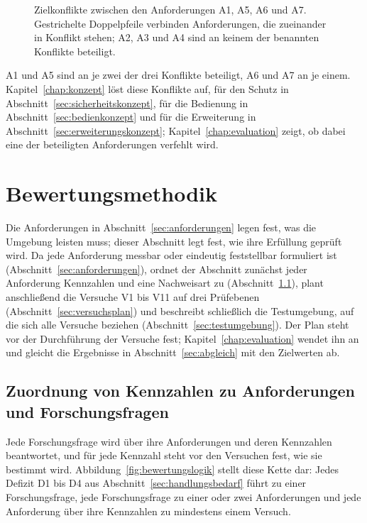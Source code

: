\begin{figure}[htbp]
  \centering
  
  \caption[Zielkonflikte zwischen den Anforderungen]{Zielkonflikte zwischen den Anforderungen A1, A5, A6 und A7. Gestrichelte Doppelpfeile verbinden Anforderungen, die zueinander in Konflikt stehen; A2, A3 und A4 sind an keinem der benannten Konflikte beteiligt.}
  \label{fig:zielkonflikte}
\end{figure}

A1 und A5 sind an je zwei der drei Konflikte beteiligt, A6 und A7 an je einem.
Kapitel~\ref{chap:konzept} löst diese Konflikte auf, für den Schutz in Abschnitt~\ref{sec:sicherheitskonzept}, für die Bedienung in Abschnitt~\ref{sec:bedienkonzept} und für die Erweiterung in Abschnitt~\ref{sec:erweiterungskonzept}; Kapitel~\ref{chap:evaluation} zeigt, ob dabei eine der beteiligten Anforderungen verfehlt wird.

\section{Bewertungsmethodik}
\label{sec:bewertungsmethodik}
Die Anforderungen in Abschnitt~\ref{sec:anforderungen} legen fest, was die Umgebung leisten muss; dieser Abschnitt legt fest, wie ihre Erfüllung geprüft wird.
Da jede Anforderung messbar oder eindeutig feststellbar formuliert ist (Abschnitt~\ref{sec:anforderungen}), ordnet der Abschnitt zunächst jeder Anforderung Kennzahlen und eine Nachweisart zu (Abschnitt~\ref{sec:kennzahlen}), plant anschließend die Versuche V1 bis V11 auf drei Prüfebenen (Abschnitt~\ref{sec:versuchsplan}) und beschreibt schließlich die Testumgebung, auf die sich alle Versuche beziehen (Abschnitt~\ref{sec:testumgebung}).
Der Plan steht vor der Durchführung der Versuche fest; Kapitel~\ref{chap:evaluation} wendet ihn an und gleicht die Ergebnisse in Abschnitt~\ref{sec:abgleich} mit den Zielwerten ab.

\subsection{Zuordnung von Kennzahlen zu Anforderungen und Forschungsfragen}
\label{sec:kennzahlen}
Jede Forschungsfrage wird über ihre Anforderungen und deren Kennzahlen beantwortet, und für jede Kennzahl steht vor den Versuchen fest, wie sie bestimmt wird.
Abbildung~\ref{fig:bewertungslogik} stellt diese Kette dar: Jedes Defizit D1 bis D4 aus Abschnitt~\ref{sec:handlungsbedarf} führt zu einer Forschungsfrage, jede Forschungsfrage zu einer oder zwei Anforderungen und jede Anforderung über ihre Kennzahlen zu mindestens einem Versuch.

